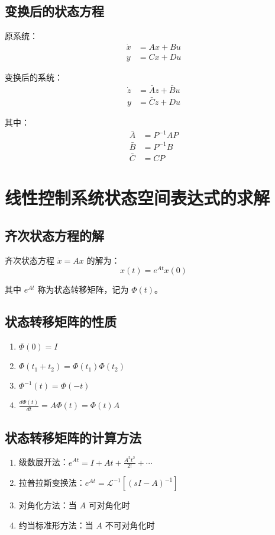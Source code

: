 \documentclass[12pt,a4paper]{article}
\begin{document}
\subsection{变换后的状态方程}
原系统：
\begin{align}
\dot{x} &= Ax + Bu \\
y &= Cx + Du
\end{align}

变换后的系统：
\begin{align}
\dot{z} &= \bar{A}z + \bar{B}u \\
y &= \bar{C}z + Du
\end{align}

其中：
\begin{align}
\bar{A} &= P^{-1}AP \\
\bar{B} &= P^{-1}B \\
\bar{C} &= CP
\end{align}

\section{线性控制系统状态空间表达式的求解}

\subsection{齐次状态方程的解}
齐次状态方程 $\dot{x} = Ax$ 的解为：
\[x(t) = e^{At}x(0)\]

其中 $e^{At}$ 称为状态转移矩阵，记为 $\Phi(t)$。

\subsection{状态转移矩阵的性质}
\begin{enumerate}
    \item $\Phi(0) = I$
    \item $\Phi(t_1 + t_2) = \Phi(t_1)\Phi(t_2)$
    \item $\Phi^{-1}(t) = \Phi(-t)$
    \item $\frac{d\Phi(t)}{dt} = A\Phi(t) = \Phi(t)A$
\end{enumerate}

\subsection{状态转移矩阵的计算方法}
\begin{enumerate}
    \item 级数展开法：$e^{At} = I + At + \frac{A^2t^2}{2!} + \cdots$
    \item 拉普拉斯变换法：$e^{At} = \mathcal{L}^{-1}[(sI-A)^{-1}]$
    \item 对角化方法：当 $A$ 可对角化时
    \item 约当标准形方法：当 $A$ 不可对角化时
\end{enumerate}
\end{document}
